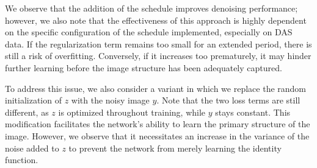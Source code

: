 We observe that the addition of the schedule improves denoising performance; however, we also note that the effectiveness of this approach is highly dependent on the specific configuration of the schedule implemented, especially on DAS data.
If the regularization term remains too small for an extended period, there is still a risk of overfitting.
Conversely, if it increases too prematurely, it may hinder further learning before the image structure has been adequately captured.

To address this issue, we also consider a variant in which we replace the random initialization of $z$ with the noisy image $y$.
Note that the two loss terms are still different, as $z$ is optimized throughout training, while $y$ stays constant.
This modification facilitates the network's ability to learn the primary structure of the image. 
However, we observe that it necessitates an increase in the variance of the noise added to $z$ to prevent the network from merely learning the identity function.